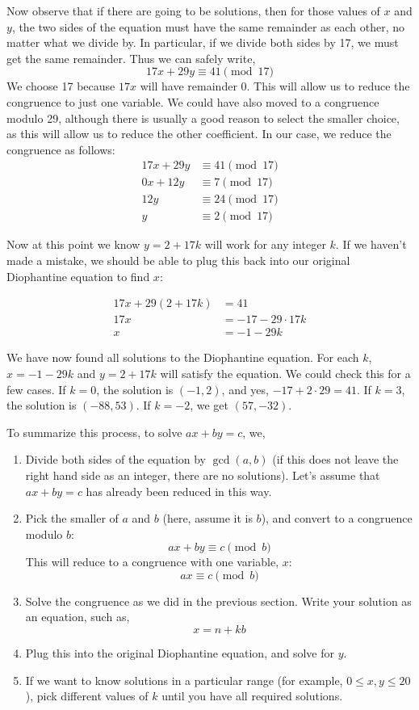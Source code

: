 \documentclass[12pt]{article}
\begin{document}
Now observe that if there are going to be solutions, then for those values of $x$ and $y$, the two sides of the equation must have the same remainder as each other, no matter what we divide by.  In particular, if we divide both sides by 17, we must get the same remainder. Thus we can safely write,
\[17x + 29y \equiv 41 \pmod{17}\]
We choose 17 because $17x$ will have remainder 0.  This will allow us to reduce the congruence to just one variable.  We could have also moved to a congruence modulo 29, although there is usually a good reason to select the smaller choice, as this will allow us to reduce the other coefficient.  In our case, we reduce the congruence as follows:
\[ \begin{aligned}
17x + 29y & \equiv 41 \pmod{17} \\
0x + 12y & \equiv 7 \pmod{17} \\
12 y & \equiv 24 \pmod{17} \\
y & \equiv 2 \pmod{17}
\end{aligned}\]

Now at this point we know $y = 2 + 17k$ will work for any integer $k$.  If we haven't made a mistake, we should be able to plug this back into our original Diophantine equation to find $x$:

\[\begin{aligned}
17x + 29(2 + 17k) & = 41\\
17x & = -17 - 29\cdot 17k\\
x & = -1-29k
\end{aligned}\]

We have now found all solutions to the Diophantine equation.  For each $k$, $x = -1-29k$ and $y = 2 + 17k$ will satisfy the equation.  We could check this for a few cases.  If $k = 0$, the solution is $(-1,2)$, and yes, $-17 + 2\cdot 29 = 41$.  If $k = 3$, the solution is $(-88, 53)$.  If $k = -2$, we get $(57, -32)$.

To summarize this process, to solve $ax + by = c$, we,
\begin{enumerate}
	\item Divide both sides of the equation by $\gcd(a,b)$ (if this does not leave the right hand side as an integer, there are no solutions).  Let's assume that $ax + by = c$ has already been reduced in this way.
	\item Pick the smaller of $a$ and $b$ (here, assume it is $b$), and convert to a congruence modulo $b$:
	\[ax + by \equiv c \pmod{b}\]
	This will reduce to a congruence with one variable, $x$:
	\[ax \equiv c \pmod{b}\]
	\item Solve the congruence as we did in the previous section.  Write your solution as an equation, such as,
	\[x = n + kb\]
	\item Plug this into the original Diophantine equation, and solve for $y$.
	\item If we want to know solutions in a particular range (for example, $0 \le x, y \le 20$), pick different values of $k$ until you have all required solutions.
\end{enumerate}
\end{document}
